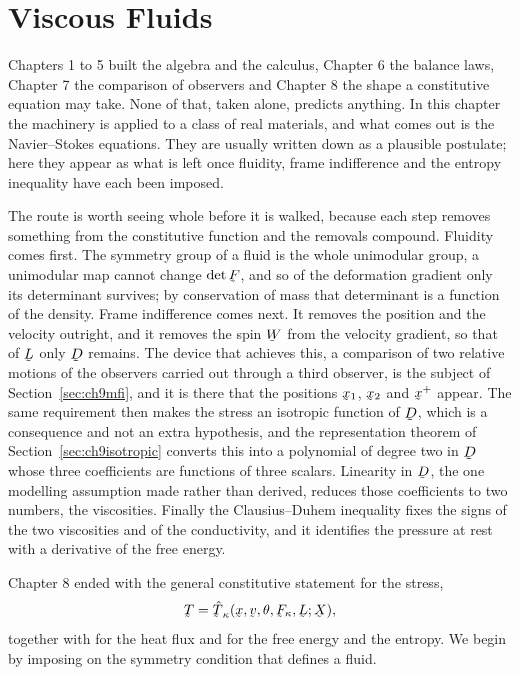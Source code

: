 \chapter{Viscous Fluids}

Chapters 1 to 5 built the algebra and the calculus, Chapter 6 the
balance laws, Chapter 7 the comparison of observers and Chapter 8 the
shape a constitutive equation may take. None of that, taken alone,
predicts anything. In this chapter the machinery is applied to a class
of real materials, and what comes out is the Navier--Stokes equations.
They are usually written down as a plausible postulate; here they appear
as what is left once fluidity, frame indifference and the entropy
inequality have each been imposed.

The route is worth seeing whole before it is walked, because each step
removes something from the constitutive function and the removals
compound. Fluidity comes first. The symmetry group of a fluid is the
whole unimodular group, a unimodular map cannot change $\det\bF$, and so
of the deformation gradient only its determinant survives; by
conservation of mass that determinant is a function of the density.
Frame indifference comes next. It removes the position and the velocity
outright, and it removes the spin $\bW$ from the velocity gradient, so
that of $\bL$ only $\bD$ remains. The device that achieves this, a
comparison of two relative motions of the observers carried out through
a third observer, is the subject of Section~\ref{sec:ch9mfi}, and it is
there that the positions $\bx_{1}$, $\bx_{2}$ and $\bx^{+}$ appear. The
same requirement then makes the stress an isotropic function of $\bD$,
which is a consequence and not an extra hypothesis, and the
representation theorem of Section~\ref{sec:ch9isotropic} converts this
into a polynomial of degree two in $\bD$ whose three coefficients are
functions of three scalars. Linearity in $\bD$, the one modelling
assumption made rather than derived, reduces those coefficients to two
numbers, the viscosities. Finally the Clausius--Duhem inequality fixes
the signs of the two viscosities and of the conductivity, and it
identifies the pressure at rest with a derivative of the free energy.

Chapter 8 ended with the general constitutive statement  for
the stress,
\[
   \bT=\hat\bT_{\kappa}(\bx,\bv,\theta,\bF_{\kappa},\bL;\bX),
\]
together with  for the heat flux and  for the free
energy and the entropy. We begin by imposing on  the symmetry
condition that defines a fluid.

